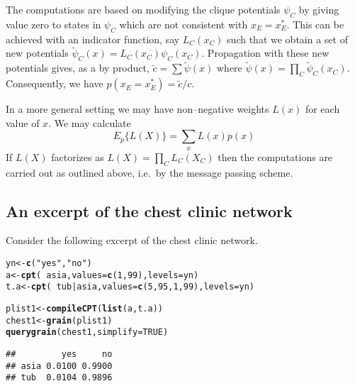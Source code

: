 \documentclass[10pt]{article}\usepackage[]{graphicx}\usepackage[]{xcolor}
\makeatletter
\newcommand{\hlnum}[1]{\textcolor[rgb]{0.686,0.059,0.569}{#1}}%
\newcommand{\hlstr}[1]{\textcolor[rgb]{0.192,0.494,0.8}{#1}}%
\newcommand{\hlopt}[1]{\textcolor[rgb]{0,0,0}{#1}}%
\newcommand{\hlstd}[1]{\textcolor[rgb]{0.345,0.345,0.345}{#1}}%
\newcommand{\hlkwb}[1]{\textcolor[rgb]{0.69,0.353,0.396}{#1}}%
\newcommand{\hlkwc}[1]{\textcolor[rgb]{0.333,0.667,0.333}{#1}}%
\newcommand{\hlkwd}[1]{\textcolor[rgb]{0.737,0.353,0.396}{\textbf{#1}}}%
\newenvironment{kframe}{%
 \def\at@end@of@kframe{}%
 \ifinner\ifhmode%
  \def\at@end@of@kframe{\end{minipage}}%
  \begin{minipage}{\columnwidth}%
 \fi\fi%
 \def\FrameCommand##1{\hskip\@totalleftmargin \hskip-\fboxsep
 \colorbox{shadecolor}{##1}\hskip-\fboxsep
     \hskip-\linewidth \hskip-\@totalleftmargin \hskip\columnwidth}%
 \MakeFramed {\advance\hsize-\width
   \@totalleftmargin\z@ \linewidth\hsize
   \@setminipage}}%
 {\par\unskip\endMakeFramed%
 \at@end@of@kframe}
\newenvironment{knitrout}{}{} %
\makeatother
\begin{document}
The computations are based on modifying the clique potentials $\psi_C$
by giving value zero to states in $\psi_C$ which are not consistent
with $x_E=x^*_E$. This can be achieved with an indicator function, say
$L_C(x_C)$ such that we obtain a set of new potentials $\tilde \psi_C(x)
= L_C(x_C) \psi_C(x_C)$. Propagation with these new potentials gives,
as a by product, $\tilde c=\sum \tilde \psi(x)$ where
$\tilde\psi(x)= \prod_C \tilde\psi_C(x_C)$. Consequently, we have
$p(x_E=x^*_E)=\tilde c / c$.

In a more general setting we may have non--negative weights $L(x)$ for
each value of $x$. We may calculate
\begin{displaymath}
  E_p\{L(X)\} = \sum_x L(x)p(x)
\end{displaymath}
If $L(X)$ factorizes as $L(X)= \prod_C L_C(X_C)$ then the computations are
carried out as outlined above, i.e.\ by the message passing scheme.


\subsection{An excerpt of the chest clinic network}
\label{sec:an-excerpt-chest}


Consider the following excerpt of the chest clinic network.

\begin{knitrout}
\color{fgcolor}\begin{kframe}
\begin{alltt}
\hlstd{yn} \hlkwb{<-} \hlkwd{c}\hlstd{(}\hlstr{"yes"}\hlstd{,} \hlstr{"no"}\hlstd{)}
\hlstd{a}    \hlkwb{<-} \hlkwd{cpt}\hlstd{(}\hlopt{~}\hlstd{asia,} \hlkwc{values}\hlstd{=}\hlkwd{c}\hlstd{(}\hlnum{1}\hlstd{,} \hlnum{99}\hlstd{),} \hlkwc{levels}\hlstd{=yn)}
\hlstd{t.a}  \hlkwb{<-} \hlkwd{cpt}\hlstd{(}\hlopt{~}\hlstd{tub}\hlopt{|}\hlstd{asia,} \hlkwc{values}\hlstd{=}\hlkwd{c}\hlstd{(}\hlnum{5}\hlstd{,} \hlnum{95}\hlstd{,} \hlnum{1}\hlstd{,} \hlnum{99}\hlstd{),} \hlkwc{levels}\hlstd{=yn)}

\hlstd{plist1} \hlkwb{<-} \hlkwd{compileCPT}\hlstd{(}\hlkwd{list}\hlstd{(a, t.a))}
\hlstd{chest1} \hlkwb{<-} \hlkwd{grain}\hlstd{(plist1)}
\hlkwd{querygrain}\hlstd{(chest1,} \hlkwc{simplify} \hlstd{=} \hlnum{TRUE}\hlstd{)}
\end{alltt}
\begin{verbatim}
##         yes     no
## asia 0.0100 0.9900
## tub  0.0104 0.9896
\end{verbatim}
\end{kframe}
\end{knitrout}
\end{document}
